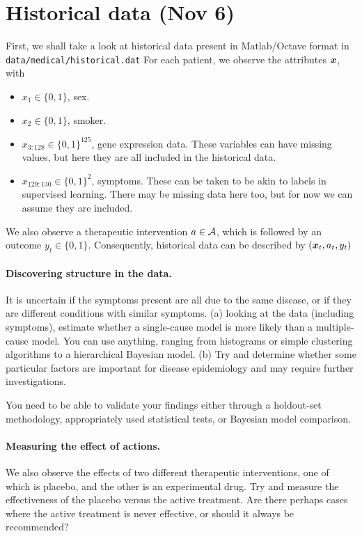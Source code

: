 
\section{Historical data (Nov 6)}

First, we shall take a look at historical data present in Matlab/Octave format in
\texttt{data/medical/historical.dat}
For each patient, we observe the attributes $\bx$, with
\begin{itemize}
\item $x_1 \in \{0,1\}$, sex.
\item $x_2 \in \{0,1\}$, smoker.
\item $x_{3:128} \in \{0,1\}^{125}$, gene expression data. These variables can have missing values, but here they are all included in the historical data.
\item $x_{129:130} \in \{0,1\}^2$, symptoms. These can be taken to be akin to labels in supervised learning. There may be missing data here too, but for now we can assume they are included.
\end{itemize}
We also observe a therapeutic intervention $a \in {\mathcal{A}}$, which is followed by an outcome $y_t \in \{0,1\}$. Consequently, historical data can be described by $(\bx_t, a_t, y_t)$

\paragraph{Discovering structure in the data.}
It is uncertain if the symptoms present are all due to the same disease, or if they are different conditions with similar symptoms. (a) looking at the data (including symptoms), estimate whether a single-cause model is more likely than a multiple-cause model. You can use anything, ranging from histograms or  simple clustering algorithms to a hierarchical Bayesian model. (b) Try and determine whether some particular factors are important for disease epidemiology and may require further investigations.

You need to be able to validate your findings either through a holdout-set methodology, appropriately used statistical tests, or Bayesian model comparison.

\paragraph{Measuring the effect of actions.}
We also observe the effects of two different therapeutic interventions, one of which is placebo, and the other is an experimental drug. Try and measure the effectiveness of the placebo versus the active treatment. Are there perhaps cases where the active treatment is never effective, or should it always be recommended?


